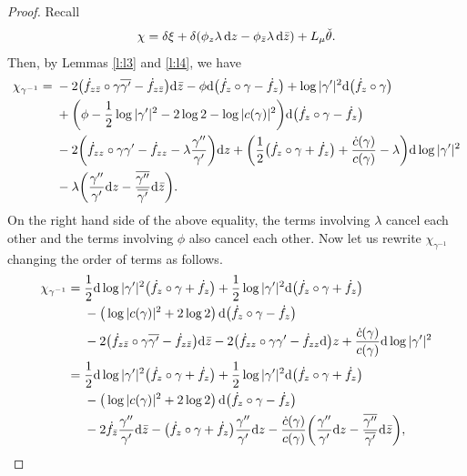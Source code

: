 \documentclass[pdftex]{sigma}%
\numberwithin{equation}{section}
\begin{document}
\begin{proof}
Recall
\begin{gather*}
{\chi}= \delta\xi + \delta(\phi_z \lambda \,{\rm d}z - \phi_{\bar{z}} \lambda\, {\rm d}\bar{z}) + L_{\mu} \check{\theta}.
\end{gather*}
Then, by Lemmas \ref{l:l3} and \ref{l:l4}, we have
\begin{align*}
\chi_{\gamma^{-1}}={}& -2\big(\dot{f}_{z\bar{z}}\circ\gamma\overline{\gamma'}-\dot{f}_{z\bar{z}}\big){\rm d}\bar{z}-\phi {\rm d}\big(\dot{f}_z\circ\gamma-\dot{f}_z\big)+\log|\gamma'|^2 {\rm d}\big(\dot{f}_z\circ\gamma\big)
\\
&+\bigg(\phi-\frac{1}{2}\log|\gamma'|^2-2\log2-\log|c(\gamma)|^2\bigg){\rm d}\big(\dot{f}_z\circ\gamma-\dot{f}_z\big)
\\
&-2\bigg(\dot{f}_{zz}\circ\gamma\gamma'-\dot{f}_{zz}-\lambda\frac{\gamma''}{\gamma'} \bigg){\rm d}z
+\bigg( \frac{1}{2}\big(\dot{f}_z\circ\gamma+\dot{f}_z\big)+\frac{\dot{c}(\gamma)}{c(\gamma)}-\lambda \bigg){\rm d}\log|\gamma'|^2
\\
&-\lambda \bigg(\frac{\gamma''}{\gamma'} {\rm d}z - \frac{\overline{\gamma''}}{\overline{\gamma'}}{\rm d}\bar{z}\bigg).
\end{align*}
On the right hand side of the above equality, the terms involving $\lambda$ cancel each other and the terms
involving $\phi$ also cancel each other. Now let us rewrite $\chi_{\gamma^{-1}}$ changing the order of terms as follows.
\begin{align*}
\chi_{\gamma^{-1}}={}&\frac12 {\rm d}\log|\gamma'|^2 \big(\dot{f}_z\circ \gamma +\dot{f}_z\big)
+\frac12 \log|\gamma'|^2 {\rm d}\big(\dot{f}_z\circ \gamma +\dot{f}_z\big)
\\
&-\big(\log|c(\gamma)|^2+2\log 2\big)\, {\rm d} \big(\dot{f}_z\circ \gamma - \dot{f}_z\big)
\\
&-2\big(\dot{f}_{z\bar{z}}\circ\gamma\overline{\gamma'}-\dot{f}_{z\bar{z}}\big){\rm d}\bar{z}
-2\big(\dot{f}_{zz}\circ\gamma\gamma'-\dot{f}_{zz} {\rm d}\big)z
+\frac{\dot{c}(\gamma)}{c(\gamma)} {\rm d}\log|\gamma'|^2
\\
={}&\frac12 {\rm d}\log|\gamma'|^2 \big(\dot{f}_z\circ \gamma +\dot{f}_z\big)
+\frac12 \log|\gamma'|^2 {\rm d}\big(\dot{f}_z\circ \gamma +\dot{f}_z\big)
\\
&-\big(\log|c(\gamma)|^2+2\log 2\big) \,{\rm d} \big(\dot{f}_z\circ \gamma - \dot{f}_z\big)
\\
&-2\dot{f}_{\bar{z}}\frac{\gamma''}{\gamma'} {\rm d}\bar{z}
-\big(\dot{f}_z\circ \gamma+\dot{f}_z\big)\frac{\gamma''}{\gamma'} {\rm d}z -\frac{\dot{c}(\gamma)}{c(\gamma)} \bigg(\frac{\gamma''}{\gamma'} {\rm d}z - \frac{\overline{\gamma''}}{\overline{\gamma'}} {\rm d}\bar{z}\bigg),

\end{align*}
\end{proof}
\end{document}
